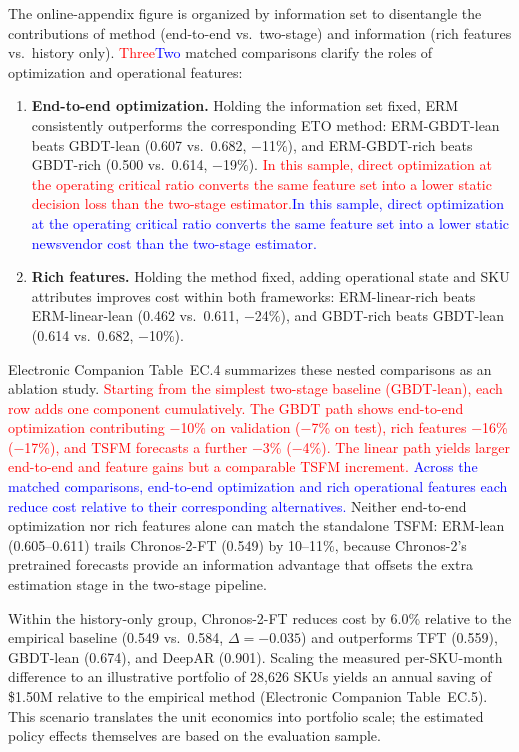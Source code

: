 \documentclass[msom,dblanonrev]{informs4}
\newcommand{\add}[1]{\textcolor{blue}{#1}}
\newcommand{\reduce}[1]{\textcolor{red}{#1}\hspace{0.5em}}
\begin{document}
The online-appendix figure is organized by information set to disentangle the contributions of method (end-to-end vs.\ two-stage) and information (rich features vs.\ history only).
\reduce{Three}\add{Two} matched comparisons clarify the roles of optimization and operational features:

\begin{enumerate}
\item \textbf{End-to-end optimization.}
  Holding the information set fixed, ERM consistently outperforms the corresponding ETO method: ERM-GBDT-lean beats GBDT-lean (0.607 vs.\ 0.682, $-$11\%), and ERM-GBDT-rich beats GBDT-rich (0.500 vs.\ 0.614, $-$19\%).
  \reduce{In this sample, direct optimization at the operating critical ratio converts the same feature set into a lower static decision loss than the two-stage estimator.}\add{In this sample, direct optimization at the operating critical ratio converts the same feature set into a lower static newsvendor cost than the two-stage estimator.}
\item \textbf{Rich features.}
  Holding the method fixed, adding operational state and SKU attributes improves cost within both frameworks: ERM-linear-rich beats ERM-linear-lean (0.462 vs.\ 0.611, $-$24\%), and GBDT-rich beats GBDT-lean (0.614 vs.\ 0.682, $-$10\%).
\end{enumerate}

\noindent Electronic Companion Table~EC.4 summarizes these nested comparisons as an ablation study.
\reduce{Starting from the simplest two-stage baseline (GBDT-lean), each row adds one component cumulatively.
The GBDT path shows end-to-end optimization contributing $-$10\% on validation ($-$7\% on test), rich features $-$16\% ($-$17\%), and TSFM forecasts a further $-$3\% ($-$4\%).
The linear path yields larger end-to-end and feature gains but a comparable TSFM increment.}
\add{Across the matched comparisons, end-to-end optimization and rich operational features each reduce cost relative to their corresponding alternatives.}
Neither end-to-end optimization nor rich features alone can match the standalone TSFM:
ERM-lean (0.605--0.611) trails Chronos-2-FT (0.549) by 10--11\%, because Chronos-2's pretrained forecasts provide an information advantage that offsets the extra estimation stage in the two-stage pipeline.

Within the history-only group, Chronos-2-FT reduces cost by 6.0\% relative to the empirical baseline (0.549 vs.\ 0.584, $\Delta = -0.035$) and outperforms TFT (0.559), GBDT-lean (0.674), and DeepAR (0.901).
Scaling the measured per-SKU-month difference to an illustrative portfolio of 28{,}626 SKUs yields an annual saving of \$1.50M relative to the empirical method (Electronic Companion Table~EC.5).
This scenario translates the unit economics into portfolio scale; the estimated policy effects themselves are based on the evaluation sample.
\end{document}
